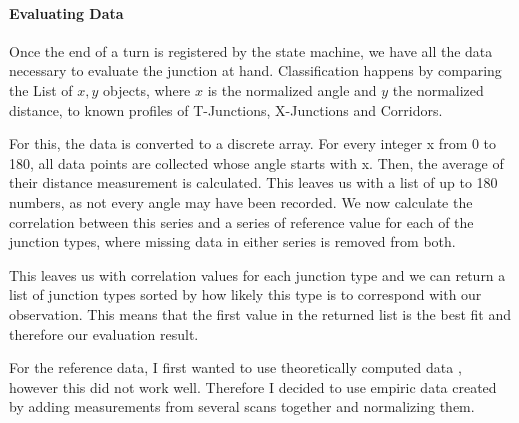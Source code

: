 
\paragraph{Evaluating Data}
Once the end of a turn is registered by the state machine, we have all the data necessary to evaluate the junction at hand.
Classification happens by comparing the List of ${x,y}$ objects, where $x$ is the normalized angle and $y$ the normalized distance, to known profiles of T-Junctions, X-Junctions and Corridors.

For this, the data is converted to a discrete array. For every integer x from 0 to 180, all data points are collected whose angle starts with x. Then, the average of their distance measurement is calculated. This leaves us with a list of up to 180 numbers, as not every angle may have been recorded. We now calculate the correlation between this series and a series of reference value for each of the junction types, where missing data in either series is removed from both.

This leaves us with correlation values for each junction type and we can return a list of junction types sorted by how likely this type is to correspond with our observation. This means that the first value in the returned list is the best fit and therefore our evaluation result.

For the reference data, I first wanted to use theoretically computed data %
, however this did not work well. Therefore I decided to use empiric data created by adding measurements from several scans together and normalizing them.
